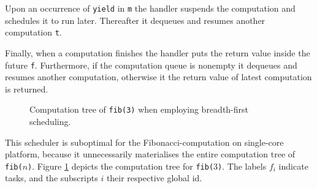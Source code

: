 \documentclass[preprint,10pt,numbers]{sigplanconf}
\begin{document}
Upon an occurrence of \texttt{yield} in \texttt{m} the handler suspends the computation and schedules it to run later. Thereafter it dequeues and resumes another computation \texttt{t}.

Finally, when a computation finishes the handler puts the return value inside the future \texttt{f}. Furthermore, if the computation queue is nonempty it dequeues and resumes another computation, otherwise it the return value of latest computation is returned.
\begin{figure}
\begin{center}
\caption{Computation tree of \texttt{fib(3)} when employing breadth-first scheduling.}\label{fig:bfs}
\end{center}
\end{figure}

This scheduler is suboptimal for the Fibonacci-computation on single-core platform, because it unnecessarily materialises the entire computation tree of \texttt{fib($n$)}. Figure \ref{fig:bfs} depicts the computation tree for \texttt{fib($3$)}. The labels $f_i$ indicate tasks, and the subscripts $i$ their respective global id.
\end{document}
